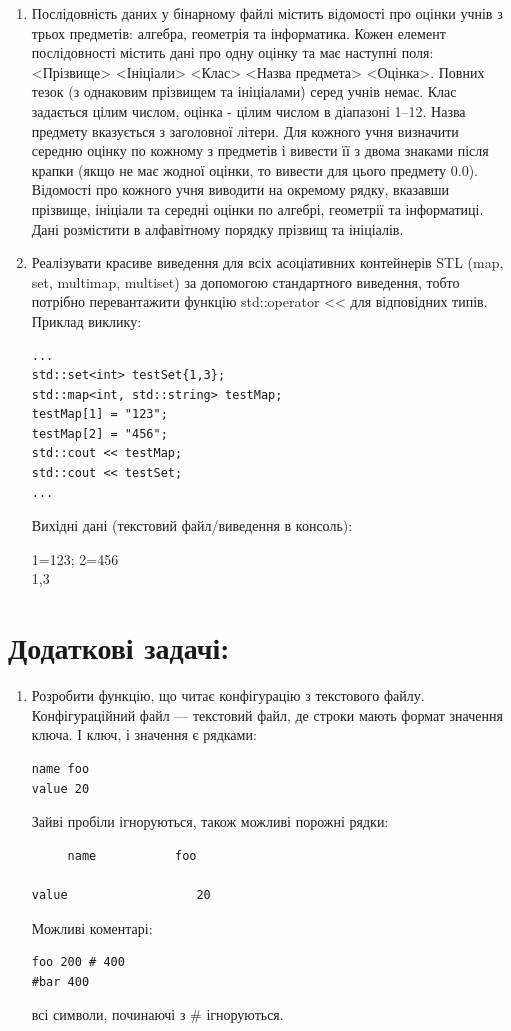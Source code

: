 \documentclass[a5paper,titlepage,openany,twoside,
]
{book_unv}%
\begin{document}
\begin{enumerate}
\begin{enumerate}
\begin{enumerate}
\item
Послідовність даних у бінарному файлі містить відомості про оцінки
учнів з трьох предметів: алгебра, геометрія та інформатика.
Кожен елемент послідовності містить дані про одну
оцінку та має наступні поля:
<Прізвище> <Ініціали> <Клас> <Назва предмета> <Оцінка>. 
Повних тезок (з однаковим прізвищем та ініціалами)
серед учнів немає. Клас задається цілим числом, оцінка - цілим
числом в діапазоні 1–12. Назва предмету вказується з заголовної
літери. Для кожного учня визначити середню оцінку по кожному з предметів і
 вивести її з двома знаками після крапки (якщо не має жодної оцінки, то вивести
 для цього предмету 0.0). Відомості про кожного учня виводити
на окремому рядку, вказавши прізвище, ініціали та середні оцінки
по алгебрі, геометрії та інформатиці. Дані розмістити в алфавітному порядку
прізвищ та ініціалів. 

\item
Реалізувати красиве виведення для всіх асоціативних контейнерів STL
(map, set, multimap, multiset) за допомогою стандартного виведення, 
тобто потрібно перевантажити функцію std::operator \textless{}\textless{} 
для відповідних типів. Приклад виклику: 
\begin{verbatim}
...
std::set<int> testSet{1,3};
std::map<int, std::string> testMap;
testMap[1] = "123";
testMap[2] = "456";
std::cout << testMap;
std::cout << testSet;
...
\end{verbatim}
Вихідні дані (текстовий файл/виведення в консоль):

1=123; 2=456\\
1,3
\end{enumerate}

\section{Додаткові задачі:}
\begin{enumerate}
\def\labelenumi{\arabic{enumi})}
\setcounter{enumi}{20}
\item
Розробити функцію, що читає конфігурацію з текстового файлу.
Конфігураційний файл --- текстовий файл, де строки мають формат значення ключа.
І ключ, і значення є рядками:
\begin{verbatim} 
name foo
value 20
\end{verbatim}
Зайві пробіли ігноруються, також можливі порожні рядки:
\begin{verbatim}
     name           foo

value                  20
\end{verbatim}
Можливі коментарі:
\begin{verbatim}
foo 200 # 400
#bar 400
\end{verbatim}
всі символи, починаючі з \# ігноруються.


\end{enumerate}
\end{enumerate}
\end{enumerate}
\end{document}
